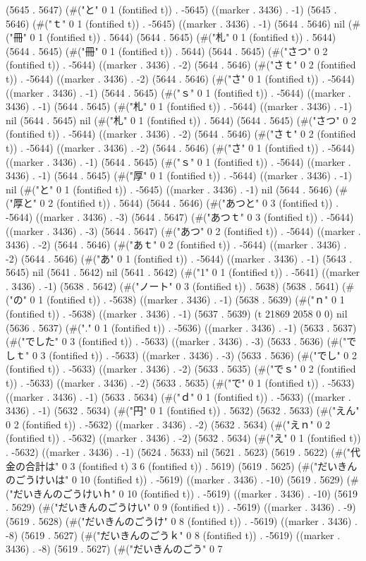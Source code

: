 (5645 . 5647) (#("と" 0 1 (fontified t)) . -5645) ((marker . 3436) . -1) (5645 . 5646) (#("ｔ" 0 1 (fontified t)) . -5645) ((marker . 3436) . -1) (5644 . 5646) nil (#("冊" 0 1 (fontified t)) . 5644) (5644 . 5645) (#("札" 0 1 (fontified t)) . 5644) (5644 . 5645) (#("冊" 0 1 (fontified t)) . 5644) (5644 . 5645) (#("さつ" 0 2 (fontified t)) . -5644) ((marker . 3436) . -2) (5644 . 5646) (#("さｔ" 0 2 (fontified t)) . -5644) ((marker . 3436) . -2) (5644 . 5646) (#("さ" 0 1 (fontified t)) . -5644) ((marker . 3436) . -1) (5644 . 5645) (#("ｓ" 0 1 (fontified t)) . -5644) ((marker . 3436) . -1) (5644 . 5645) (#("札" 0 1 (fontified t)) . -5644) ((marker . 3436) . -1) nil (5644 . 5645) nil (#("札" 0 1 (fontified t)) . 5644) (5644 . 5645) (#("さつ" 0 2 (fontified t)) . -5644) ((marker . 3436) . -2) (5644 . 5646) (#("さｔ" 0 2 (fontified t)) . -5644) ((marker . 3436) . -2) (5644 . 5646) (#("さ" 0 1 (fontified t)) . -5644) ((marker . 3436) . -1) (5644 . 5645) (#("ｓ" 0 1 (fontified t)) . -5644) ((marker . 3436) . -1) (5644 . 5645) (#("厚" 0 1 (fontified t)) . -5644) ((marker . 3436) . -1) nil (#("と" 0 1 (fontified t)) . -5645) ((marker . 3436) . -1) nil (5644 . 5646) (#("厚と" 0 2 (fontified t)) . 5644) (5644 . 5646) (#("あつと" 0 3 (fontified t)) . -5644) ((marker . 3436) . -3) (5644 . 5647) (#("あつｔ" 0 3 (fontified t)) . -5644) ((marker . 3436) . -3) (5644 . 5647) (#("あつ" 0 2 (fontified t)) . -5644) ((marker . 3436) . -2) (5644 . 5646) (#("あｔ" 0 2 (fontified t)) . -5644) ((marker . 3436) . -2) (5644 . 5646) (#("あ" 0 1 (fontified t)) . -5644) ((marker . 3436) . -1) (5643 . 5645) nil (5641 . 5642) nil (5641 . 5642) (#("1" 0 1 (fontified t)) . -5641) ((marker . 3436) . -1) (5638 . 5642) (#("ノート" 0 3 (fontified t)) . 5638) (5638 . 5641) (#("の" 0 1 (fontified t)) . -5638) ((marker . 3436) . -1) (5638 . 5639) (#("ｎ" 0 1 (fontified t)) . -5638) ((marker . 3436) . -1) (5637 . 5639) (t 21869 2058 0 0) nil (5636 . 5637) (#("." 0 1 (fontified t)) . -5636) ((marker . 3436) . -1) (5633 . 5637) (#("でした" 0 3 (fontified t)) . -5633) ((marker . 3436) . -3) (5633 . 5636) (#("でしｔ" 0 3 (fontified t)) . -5633) ((marker . 3436) . -3) (5633 . 5636) (#("でし" 0 2 (fontified t)) . -5633) ((marker . 3436) . -2) (5633 . 5635) (#("でｓ" 0 2 (fontified t)) . -5633) ((marker . 3436) . -2) (5633 . 5635) (#("で" 0 1 (fontified t)) . -5633) ((marker . 3436) . -1) (5633 . 5634) (#("ｄ" 0 1 (fontified t)) . -5633) ((marker . 3436) . -1) (5632 . 5634) (#("円" 0 1 (fontified t)) . 5632) (5632 . 5633) (#("えん" 0 2 (fontified t)) . -5632) ((marker . 3436) . -2) (5632 . 5634) (#("えｎ" 0 2 (fontified t)) . -5632) ((marker . 3436) . -2) (5632 . 5634) (#("え" 0 1 (fontified t)) . -5632) ((marker . 3436) . -1) (5624 . 5633) nil (5621 . 5623) (5619 . 5622) (#("代金の合計は" 0 3 (fontified t) 3 6 (fontified t)) . 5619) (5619 . 5625) (#("だいきんのごうけいは" 0 10 (fontified t)) . -5619) ((marker . 3436) . -10) (5619 . 5629) (#("だいきんのごうけいｈ" 0 10 (fontified t)) . -5619) ((marker . 3436) . -10) (5619 . 5629) (#("だいきんのごうけい" 0 9 (fontified t)) . -5619) ((marker . 3436) . -9) (5619 . 5628) (#("だいきんのごうけ" 0 8 (fontified t)) . -5619) ((marker . 3436) . -8) (5619 . 5627) (#("だいきんのごうｋ" 0 8 (fontified t)) . -5619) ((marker . 3436) . -8) (5619 . 5627) (#("だいきんのごう" 0 7 